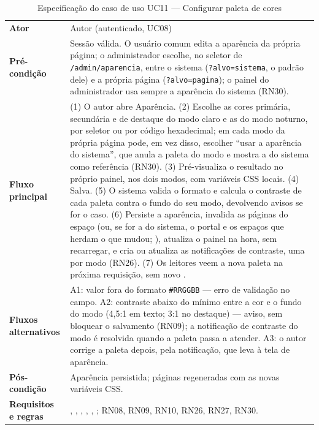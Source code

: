 \begin{table}[htb]
\caption{Especificação do caso de uso UC11 --- Configurar paleta de cores}\label{tab:uc11}
\small
\begin{tabularx}{\linewidth}{@{}L{3.0cm}Y@{}}
\toprule
\textbf{Ator} & Autor (autenticado, UC08)\\
\textbf{Pré-condição} & Sessão válida. O usuário comum edita a aparência da própria página; o administrador escolhe, no seletor de \texttt{/admin/aparencia}, entre o sistema (\texttt{?alvo=sistema}, o padrão dele) e a própria página (\texttt{?alvo=pagina}); o painel do administrador usa sempre a aparência do sistema (RN30).\\
\textbf{Fluxo principal} & (1) O autor abre Aparência. (2) Escolhe as cores primária, secundária e de destaque do modo claro e as do modo noturno, por seletor ou por código hexadecimal; em cada modo da própria página pode, em vez disso, escolher ``usar a aparência do sistema'', que anula a paleta do modo e mostra a do sistema como referência (RN30). (3) Pré-visualiza o resultado no próprio painel, nos dois modos, com variáveis CSS locais. (4) Salva. (5) O sistema valida o formato e calcula o contraste de cada paleta contra o fundo do seu modo, devolvendo avisos se for o caso. (6) Persiste a aparência, invalida as páginas do espaço (ou, se for a do sistema, o portal e os espaços que herdam o que mudou; ), atualiza o painel na hora, sem recarregar, e cria ou atualiza as notificações de contraste, uma por modo (RN26). (7) Os leitores veem a nova paleta na próxima requisição, sem novo .\\
\textbf{Fluxos alternativos} & A1: valor fora do formato \texttt{\#RRGGBB} --- erro de validação no campo. A2: contraste abaixo do mínimo entre a cor e o fundo do modo (4,5:1 em texto; 3:1 no destaque) --- aviso, sem bloquear o salvamento (RN09); a notificação de contraste do modo é resolvida quando a paleta passa a atender. A3: o autor corrige a paleta depois, pela notificação, que leva à tela de aparência.\\
\textbf{Pós-condição} & Aparência persistida; páginas regeneradas com as novas variáveis CSS.\\
\textbf{Requisitos e regras} & , , , , , ; RN08, RN09, RN10, RN26, RN27, RN30.\\
\bottomrule
\end{tabularx}
\end{table}


